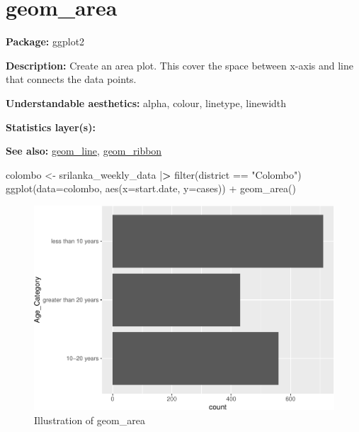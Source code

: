 \documentclass[
]{book}
\newenvironment{Shaded}{\begin{snugshade}}{\end{snugshade}}
\newcommand{\AttributeTok}[1]{\textcolor[rgb]{0.77,0.63,0.00}{#1}}
\newcommand{\ErrorTok}[1]{\textcolor[rgb]{0.64,0.00,0.00}{\textbf{#1}}}
\newcommand{\FunctionTok}[1]{\textcolor[rgb]{0.00,0.00,0.00}{#1}}
\newcommand{\NormalTok}[1]{#1}
\newcommand{\OtherTok}[1]{\textcolor[rgb]{0.56,0.35,0.01}{#1}}
\newcommand{\SpecialCharTok}[1]{\textcolor[rgb]{0.00,0.00,0.00}{#1}}
\newcommand{\StringTok}[1]{\textcolor[rgb]{0.31,0.60,0.02}{#1}}
\begin{document}
\hypertarget{area}{%
\section{geom\_area}\label{area}}

\textbf{Package: } ggplot2 \autocite{R-ggplot2}

\textbf{Description: }Create an area plot. This cover the space between x-axis and line that connects the data points.

\textbf{Understandable aesthetics:} alpha, colour, linetype, linewidth

\textbf{Statistics layer(s):}

\textbf{See also: } \protect\hyperlink{line}{geom\_line}, \protect\hyperlink{ribbon}{geom\_ribbon}

\begin{Shaded}
\begin{Highlighting}[]
\NormalTok{colombo }\OtherTok{\textless{}{-}}\NormalTok{ srilanka\_weekly\_data }\SpecialCharTok{|}\ErrorTok{\textgreater{}}
  \FunctionTok{filter}\NormalTok{(district }\SpecialCharTok{==} \StringTok{"Colombo"}\NormalTok{)}
\FunctionTok{ggplot}\NormalTok{(}\AttributeTok{data=}\NormalTok{colombo, }\FunctionTok{aes}\NormalTok{(}\AttributeTok{x=}\NormalTok{start.date, }\AttributeTok{y=}\NormalTok{cases)) }\SpecialCharTok{+} 
  \FunctionTok{geom\_area}\NormalTok{()}
\end{Highlighting}
\end{Shaded}

\begin{figure}
\centering
\includegraphics{Data-Visualisation-geom-Encyclopedia_files/figure-latex/unnamed-chunk-18-1.pdf}
\caption{\label{fig:unnamed-chunk-18}Illustration of geom\_area}
\end{figure}
\end{document}
